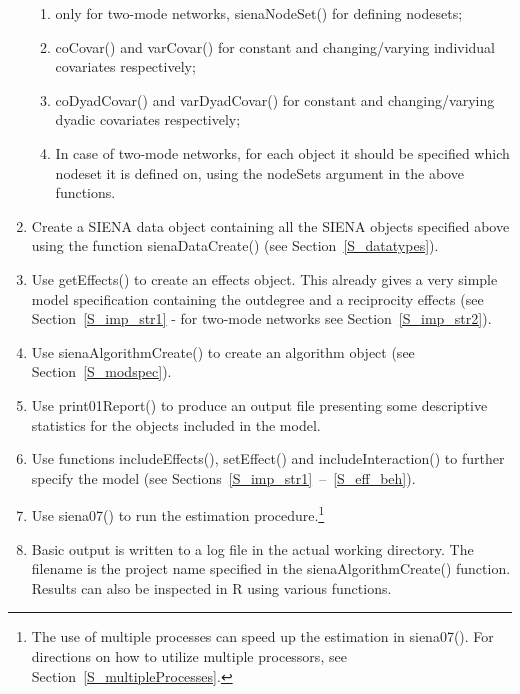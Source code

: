 \documentclass[a4paper,fleqn,11pt]{article}
\newcommand{\+}{\, + \,}
\newcommand{\sfn}[1]{\textsf{#1}}
\newcommand{\R}{{\sf R }}
\newcommand{\SI}{{\sf SIENA }}
\begin{document}
\begin{enumerate}
\begin{enumerate}
		\item	only for two-mode networks, \sfn{sienaNodeSet()} for defining nodesets;
		\item	\sfn{coCovar()} and \sfn{varCovar()} for constant and
                changing/varying individual covariates respectively;
		\item	\sfn{coDyadCovar()} and \sfn{varDyadCovar()} for
                constant and changing/varying dyadic covariates respectively;
		\item	In case of two-mode networks, for each object it should
                be specified which nodeset it is defined on, using the
                \sfn{nodeSets} argument in the above functions.
	\end{enumerate}
	\item	Create a \SI data object containing all the \SI objects
            specified above using the function \sfn{sienaDataCreate()}
            (see Section~\ref{S_datatypes}).
	\item	Use \sfn{getEffects()} to create an effects object.
            This already gives a very simple model specification
            containing the outdegree and a reciprocity effects
            (see Section~\ref{S_imp_str1} - for two-mode networks see
            Section~\ref{S_imp_str2}).
	\item	Use \sfn{sienaAlgorithmCreate()} to create an algorithm object
                (see Section~\ref{S_modspec}).
	\item	Use \sfn{print01Report()} to produce an output file
                 presenting some descriptive statistics
                for the objects included in the model.
	\item	Use functions \sfn{includeEffects()}, \sfn{setEffect()} and
            \sfn{includeInteraction()} to further specify the model
            (see Sections~\ref{S_imp_str1}~--~\ref{S_eff_beh}).
	\item	Use \sfn{siena07()} to run the estimation procedure.\footnote{The
            use of multiple processes can speed up the estimation in \sfn{siena07()}.
            For directions on how to utilize multiple processors,
            see Section~\ref{S_multipleProcesses}.}
	\item	Basic output is written to a log file in the actual working directory.
             The filename is the project name specified in the
             \sfn{sienaAlgorithmCreate()} function. Results can also be
             inspected in \R using various functions.
\end{enumerate}
\end{document}
